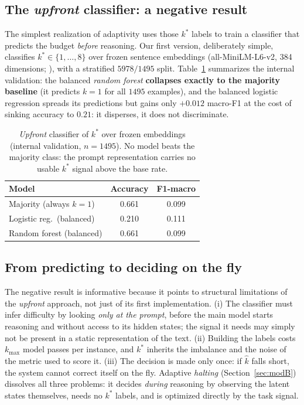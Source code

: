 \documentclass[11pt]{article}
\begin{document}
\subsection{The \textit{upfront} classifier: a negative result}
\label{sec:clasificador}

The simplest realization of adaptivity uses those $k^*$ labels to train a classifier that predicts the budget \emph{before} reasoning. Our first version, deliberately simple, classifies $k^* \in \{1,\dots,8\}$ over frozen sentence embeddings (all-MiniLM-L6-v2, 384 dimensions; \citealp{reimers2019sbert}), with a stratified $5978/1495$ split. Table~\ref{tab:clasificador} summarizes the internal validation: the balanced \textit{random forest} \textbf{collapses exactly to the majority baseline} (it predicts $k{=}1$ for all $1495$ examples), and the balanced logistic regression spreads its predictions but gains only $+0.012$ macro-F1 at the cost of sinking accuracy to $0.21$: it disperses, it does not discriminate.

\begin{table}[t]
  \centering
  \small
  \begin{tabular}{lcc}
    \toprule
    \textbf{Model} & \textbf{Accuracy} & \textbf{F1-macro} \\
    \midrule
    Majority (always $k{=}1$) & 0.661 & 0.099 \\
    Logistic reg.\ (balanced) & 0.210 & 0.111 \\
    Random forest (balanced) & 0.661 & 0.099 \\
    \bottomrule
  \end{tabular}
  \caption{\textit{Upfront} classifier of $k^*$ over frozen embeddings (internal validation, $n{=}1495$). No model beats the majority class: the prompt representation carries no usable $k^*$ signal above the base rate.}
  \label{tab:clasificador}
\end{table}

\subsection{From predicting to deciding on the fly}
\label{sec:pivot}

The negative result is informative because it points to structural limitations of the \textit{upfront} approach, not just of its first implementation. (i) The classifier must infer difficulty by looking \emph{only at the prompt}, before the main model starts reasoning and without access to its hidden states; the signal it needs may simply not be present in a static representation of the text. (ii) Building the labels costs $k_{\max}$ model passes per instance, and $k^*$ inherits the imbalance and the noise of the metric used to score it. (iii) The decision is made only once: if $\hat{k}$ falls short, the system cannot correct itself on the fly. Adaptive \textit{halting} (Section~\ref{sec:modB}) dissolves all three problems: it decides \emph{during} reasoning by observing the latent states themselves, needs no $k^*$ labels, and is optimized directly by the task signal.
\end{document}
